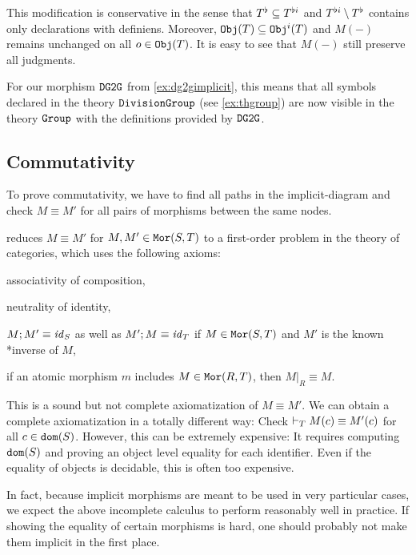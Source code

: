 This modification is conservative in the sense that $T^\flat\subseteq T^{\flat i}$ and $T^{\flat i}\setminus T^\flat$ contains only declarations with definiens.
Moreover, $\mathtt{Obj}(T)\subseteq\mathtt{Obj}^i(T)$ and $M(-)$ remains unchanged on all $o\in\mathtt{Obj}(T)$.
It is easy to see that $M(-)$ still preserve all judgments.

\begin{example}
	For our morphism $\operatorname{\mathtt{DG2G}}$ from \autoref{ex:dg2gimplicit}, this means that all symbols declared in the theory $\operatorname{\mathtt{DivisionGroup}}$ (see \autoref{ex:thgroup}) are now visible in the theory $\operatorname{\mathtt{Group}}$ with the definitions provided by $\operatorname{\mathtt{DG2G}}$.
\end{example}

\subsection{Commutativity}\label{sec:commute}

To prove commutativity, we have to find all paths in the implicit-diagram and check $M\equiv M'$ for all pairs of morphisms between the same nodes.

\mmt reduces $M\equiv M'$ for $M,M'\in\mathtt{Mor}(S,T)$ to a first-order problem in the theory of categories, which uses the following axioms:
\begin{compactitem}
\item associativity of composition,
\item neutrality of identity,
\item $M;M'\equiv \mathit{id}_{S}$ as well as $M';M\equiv\mathit{id}_{T}$ if $M\in\mathtt{Mor}(S,T)$ and $M'$ is the known *inverse of $M$,
\item if an atomic morphism $m$ includes $M\in\mathtt{Mor}(R,T)$, then $M|_R\equiv M$.
\end{compactitem}

This is a sound but not complete axiomatization of $M\equiv M'$.
We can obtain a complete axiomatization in a totally different way: Check $\vdash_T M(c)\equiv M'(c)$ for all $c\in\mathtt{dom}(S)$.
However, this can be extremely expensive: It requires computing $\mathtt{dom}(S)$ and proving an object level equality for each identifier.
Even if the equality of objects is decidable, this is often too expensive.

In fact, because implicit morphisms are meant to be used in very particular cases, we expect the above incomplete calculus to perform reasonably well in practice.
If showing the equality of certain morphisms is hard, one should probably not make them implicit in the first place.


